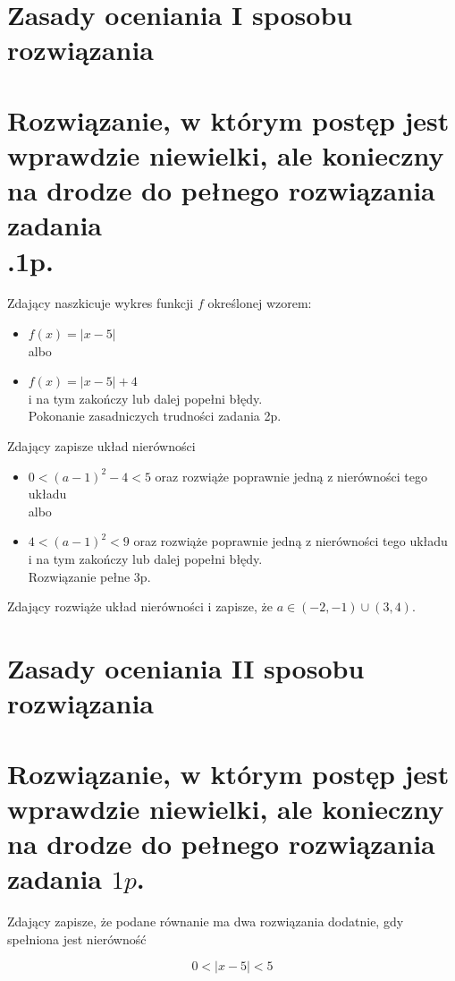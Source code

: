 \documentclass[10pt]{article}
\begin{document}
\section*{Zasady oceniania I sposobu rozwiązania}
\section*{Rozwiązanie, w którym postęp jest wprawdzie niewielki, ale konieczny na drodze do pełnego rozwiązania zadania \\
 .1p.}
Zdający naszkicuje wykres funkcji $f$ określonej wzorem:

\begin{itemize}
  \item $f(x)=|x-5|$\\
albo
  \item $f(x)=|x-5|+4$\\
i na tym zakończy lub dalej popełni błędy.\\
Pokonanie zasadniczych trudności zadania 2p.
\end{itemize}

Zdający zapisze układ nierówności

\begin{itemize}
  \item $0<(a-1)^{2}-4<5$ oraz rozwiąże poprawnie jedną z nierówności tego układu\\
albo
  \item $4<(a-1)^{2}<9$ oraz rozwiąże poprawnie jedną z nierówności tego układu\\
i na tym zakończy lub dalej popełni błędy.\\
Rozwiązanie pełne 3p.
\end{itemize}

Zdający rozwiąże układ nierówności i zapisze, że $a \in(-2,-1) \cup(3,4)$.

\section*{Zasady oceniania II sposobu rozwiązania}
\section*{Rozwiązanie, w którym postęp jest wprawdzie niewielki, ale konieczny na drodze do pełnego rozwiązania zadania $1 p$.}
Zdający zapisze, że podane równanie ma dwa rozwiązania dodatnie, gdy spełniona jest nierówność

$$
0<|x-5|<5
$$
\end{document}
